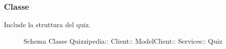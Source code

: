 \subsubsection{Classe }
Include la struttura del quiz.
\begin{figure}[H]
\centering
\noindent{}
\caption[Schema Classe Quiz]{Schema Classe Quizzipedia:: Client:: ModelClient:: Services:: Quiz}
\end{figure}

